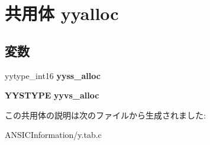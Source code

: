 \section{共用体 yyalloc}
\label{unionyyalloc}
\subsection*{変数}
\begin{DoxyCompactItemize}
\item 
yytype\_\-int16 {\bfseries yyss\_\-alloc}\label{unionyyalloc_a26e6b311cc4eccee5ad7ac3840622b22}

\item 
{\bf YYSTYPE} {\bfseries yyvs\_\-alloc}\label{unionyyalloc_a891efbd91c083d987c99bd4be8d06f50}

\end{DoxyCompactItemize}


この共用体の説明は次のファイルから生成されました:\begin{DoxyCompactItemize}
\item 
ANSICInformation/y.tab.c\end{DoxyCompactItemize}
